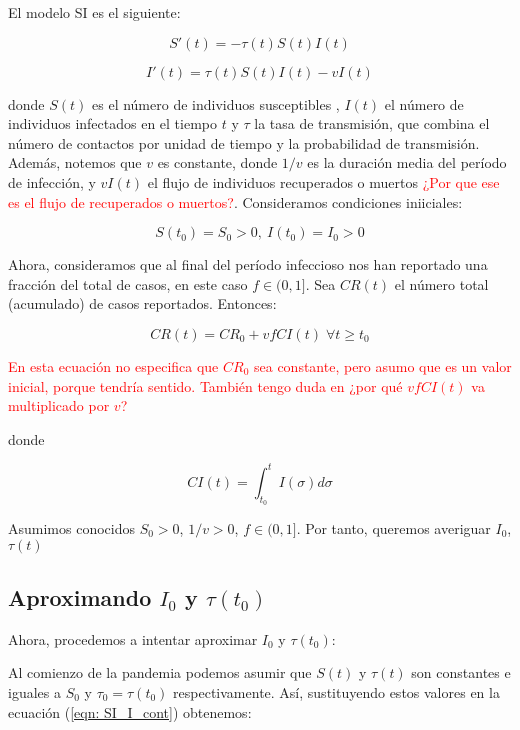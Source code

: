 El modelo SI es el siguiente:

\begin{equation}
\label{eqn: SI_S_cont}
S'(t) = -\tau (t)S(t)I(t)
\end{equation}

\begin{equation}
\label{eqn: SI_I_cont}
I'(t) = \tau (t)S(t)I(t) -vI(t)
\end{equation}

donde $S(t)$ es el número de individuos susceptibles , $I(t)$ el número de individuos infectados en el tiempo $t$ y $\tau$ la tasa de transmisión, que combina el número de contactos por unidad de tiempo y la probabilidad de transmisión. Además, notemos que $v$ es constante, donde $1/v$ es la duración media del período de infección, y $vI(t)$ el flujo de individuos recuperados o muertos \textcolor{red}{¿Por que ese es el flujo de recuperados o muertos?}. Consideramos condiciones iniiciales:

$$S(t_0)=S_0>0, \: I(t_0)=I_0>0$$

Ahora, consideramos que al final del período infeccioso nos han reportado una fracción del total de casos, en este caso $f\in (0,1]$. Sea $CR(t)$ el número total (acumulado) de casos reportados. Entonces:

\begin{equation}
\label{eqn: acumulada}
CR(t) = CR_0 + vfCI(t) \; \forall t \geq t_0
\end{equation}

\textcolor{red}{En esta ecuación no especifica que $CR_0$ sea constante, pero asumo que es un valor inicial, porque tendría sentido. También tengo duda en ¿por qué $vfCI(t)$ va multiplicado por $v$?}

donde

$$CI(t) = \int_{t_0}^t I(\sigma ) d\sigma $$

Asumimos conocidos $S_0 > 0$, $1/v>0$, $f\in (0,1]$. Por tanto, queremos averiguar $I_0$, $\tau (t)$

\subsection{Aproximando $I_0$ y $\tau (t_0)$}
Ahora, procedemos a intentar aproximar $I_0$ y $\tau (t_0)$:

Al comienzo de la pandemia podemos asumir que $S(t)$ y $\tau (t)$ son constantes e iguales a $S_0$ y $\tau_0 = \tau (t_0)$ respectivamente. Así, sustituyendo estos valores en la ecuación (\ref{eqn: SI_I_cont}) obtenemos:

